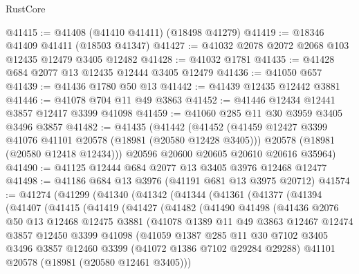 \begin{lexlean}{RustCore}
\begin{coremodule}
@41415 := @41408 (@41410 @41411) (@18498 @41279)
@41419 := @18346 @41409 @41411 (@18503 @41347)
@41427 := @41032 @2078 @2072 @2068 @103 @12435 @12479 @3405 @12482
@41428 := @41032 @1781
@41435 := @41428 @684 @2077 @13 @12435 @12444 @3405 @12479
@41436 := @41050 @657
@41439 := @41436 @1780 @50 @13
@41442 := @41439 @12435 @12442 @3881
@41446 := @41078 @704 @11 @49 @3863
@41452 := @41446 @12434 @12441 @3857 @12417 @3399 @41098
@41459 := @41060 @285 @11 @30 @3959 @3405 @3496 @3857
@41482 := @41435
    (@41442
      (@41452
        (@41459 @12427 @3399 @41076 @41101 @20578 (@18981 (@20580 @12428 @3405)))
        @20578
        (@18981 (@20580 @12418 @12434)))
      @20596
      @20600
      @20605
      @20610
      @20616
      @35964)
@41490 := @41125 @12444 @684 @2077 @13 @3405 @3976 @12468 @12477
@41498 := @41186 @684 @13 @3976 (@41191 @681 @13 @3975 @20712)
@41574 := @41274
    (@41299
      (@41340
        (@41342
          (@41344
            (@41361
              (@41377
                (@41394
                  (@41407
                    (@41415
                      (@41419
                        (@41427
                          (@41482
                            (@41490
                              @41498
                              (@41436
                                @2076
                                @50
                                @13
                                @12468
                                @12475
                                @3881
                                (@41078
                                  @1389
                                  @11
                                  @49
                                  @3863
                                  @12467
                                  @12474
                                  @3857
                                  @12450
                                  @3399
                                  @41098
                                  (@41059
                                    @1387
                                    @285
                                    @11
                                    @30
                                    @7102
                                    @3405
                                    @3496
                                    @3857
                                    @12460
                                    @3399
                                    (@41072 @1386 @7102 @29284 @29288)
                                    @41101
                                    @20578
                                    (@18981 (@20580 @12461 @3405)))

\end{coremodule}
\end{lexlean}
